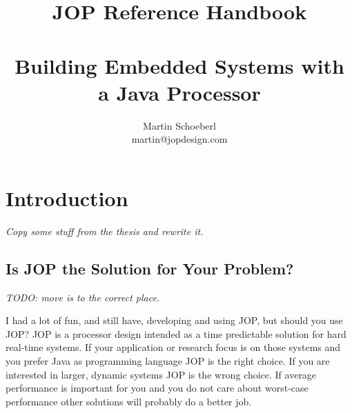 



%






\frontmatter \pagestyle{empty}

\extratitle{JOP Reference Handbook\\
Building Embedded Systems with a Java Processor}

\subject{Test Subject}
\title{JOP Reference Handbook\\
\ \\
\Large Building Embedded Systems with a Java Processor}
\author{Martin Schoeberl\\martin@jopdesign.com}
\maketitle \cleardoublepage



\pagestyle{scrheadings}

\tableofcontents \cleardoublepage

\mainmatter


\chapter{Introduction}
\label{chap:intro}


\emph{Copy some stuff from the thesis and rewrite it.}
    

\section{Is JOP the Solution for Your Problem?}

\emph{TODO: move is to the correct place.}

I had a lot of fun, and still have, developing and using JOP, but
should you use JOP? JOP is a processor design intended as a time
predictable solution for hard real-time systems. If your application
or research focus is on those systems and you prefer Java as
programming language JOP is the right choice. If you are interested
in larger, dynamic systems JOP is the wrong choice. If average
performance is important for you and you do not care about
worst-case performance other solutions will probably do a better
job.



